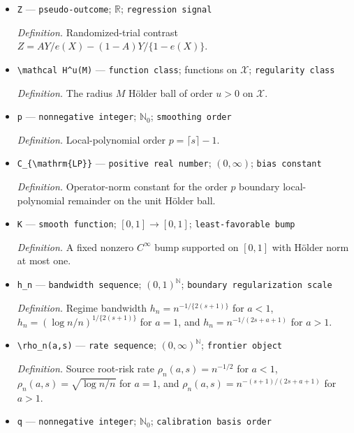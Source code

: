 \documentclass{article}
\begin{document}
\begin{itemize}
  \item \texttt{Z} --- \texttt{pseudo-\allowbreak{}outcome}; \(\mathbb R\); \texttt{regression signal}
  \par\smallskip\noindent\emph{Definition.} Randomized-trial contrast \(Z=AY/e(X)-(1-A)Y/\{1-e(X)\}\).
  \item \texttt{\textbackslash{}\allowbreak{}mathcal H\textasciicircum{}u(M)} --- \texttt{function class}; functions on \(\mathcal X\); \texttt{regularity class}
  \par\smallskip\noindent\emph{Definition.} The radius \(M\) Hölder ball of order \(u>0\) on \(\mathcal X\).
  \item \texttt{p} --- \texttt{nonnegative integer}; \(\mathbb N_0\); \texttt{smoothing order}
  \par\smallskip\noindent\emph{Definition.} Local-polynomial order \(p=\lceil s\rceil-1\).
  \item \texttt{C\_\allowbreak{}\{\textbackslash{}\allowbreak{}mathrm\{LP\}\allowbreak{}\}\allowbreak{}} --- \texttt{positive real number}; \((0,\infty)\); \texttt{bias constant}
  \par\smallskip\noindent\emph{Definition.} Operator-norm constant for the order \(p\) boundary local-polynomial remainder on the unit Hölder ball.
  \item \texttt{K} --- \texttt{smooth function}; \([0,1]\to[0,1]\); \texttt{least-\allowbreak{}favorable bump}
  \par\smallskip\noindent\emph{Definition.} A fixed nonzero \(C^\infty\) bump supported on \([0,1]\) with Hölder norm at most one.
  \item \texttt{h\_\allowbreak{}n} --- \texttt{bandwidth sequence}; \((0,1)^\mathbb N\); \texttt{boundary regularization scale}
  \par\smallskip\noindent\emph{Definition.} Regime bandwidth \(h_n=n^{-1/\{2(s+1)\}}\) for \(a<1\), \(h_n=(\log n/n)^{1/\{2(s+1)\}}\) for \(a=1\), and \(h_n=n^{-1/(2s+a+1)}\) for \(a>1\).
  \item \texttt{\textbackslash{}\allowbreak{}rho\_\allowbreak{}n(a,\allowbreak{}s)} --- \texttt{rate sequence}; \((0,\infty)^\mathbb N\); \texttt{frontier object}
  \par\smallskip\noindent\emph{Definition.} Source root-risk rate \(\rho_n(a,s)=n^{-1/2}\) for \(a<1\), \(\rho_n(a,s)=\sqrt{\log n/n}\) for \(a=1\), and \(\rho_n(a,s)=n^{-(s+1)/(2s+a+1)}\) for \(a>1\).
  \item \texttt{q} --- \texttt{nonnegative integer}; \(\mathbb N_0\); \texttt{calibration basis order}

\end{itemize}
\end{document}
